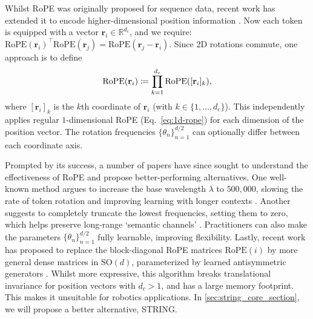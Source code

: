 Whilst RoPE was originally proposed for sequence data, recent work has extended it to encode higher-dimensional position information \citep{heo2025rotary}. 
Now each token is equipped with a vector $\mathbf{r}_i \in \mathbb{R}^{d_c}$, and we require: $\textrm{RoPE}(\mathbf{r}_i)^\top \textrm{RoPE}(\mathbf{r}_j) = \textrm{RoPE}(\mathbf{r}_j-\mathbf{r}_i)$. 
Since 2D rotations commute, one approach is to define
\vspace{-3mm}
\begin{equation} \label{eq:multidim_rope}
    \textrm{RoPE}(\mathbf{r}_i) \coloneqq \prod_{k=1}^{d_c}   \textrm{RoPE}([\mathbf{r}_i]_k),
\vspace{-1mm}
\end{equation}
where $[\mathbf{r}_i]_k$ is the $k$th coordinate of $\mathbf{r}_i$ (with $k\in\{1,...,d_c\}$).
This independently applies regular $1$-dimensional RoPE (Eq.~\ref{eq:1d-rope}) for each dimension of the position vector.
The rotation frequencies $\{ \theta_n\}_{n=1}^{d/2}$ can optionally differ between each coordinate axis. 

Prompted by its success, a number of papers have since sought to understand the effectiveness of RoPE and propose better-performing alternatives.
One well-known method argues to increase the base wavelength $\lambda$ to $500,000$, slowing the rate of token rotation and improving learning with longer contexts \citep{xiong2023effective, roziere2023code}. 
Another suggests to completely truncate the lowest frequencies, setting them to zero, which helps preserve long-range `semantic channels' \citep{barbero2024round}. 
Practitioners can also make the parameters $\{\theta_n\}_{n=1}^{d/2}$ fully learnable, improving flexibility.
Lastly, recent work has proposed to replace the block-diagonal RoPE matrices $\textrm{RoPE}(i)$ by more general dense matrices in $\textrm{SO}(d)$, parameterized by learned antisymmetric generators \citep{ostmeier2024liere}. 
Whilst more expressive, this algorithm breaks translational invariance for position vectors with $d_c>1$, and has a large memory footprint.
This makes it unsuitable for robotics applications.
In \cref{sec:string_core_section}, we will propose a better alternative, STRING.
\newpage
